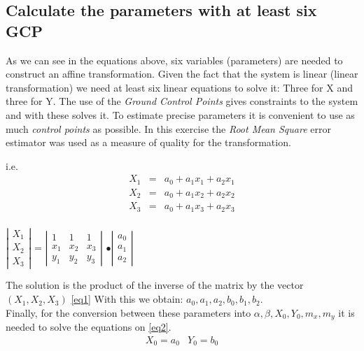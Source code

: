 \documentclass[12pt]{article}
\numberwithin{equation}{subsection}
\begin{document}
\subsection{Calculate the parameters with at least six GCP}
As we can see in the equations above, six variables (parameters) are needed to construct an affine transformation. Given the fact that the system is linear (linear transformation) we need at least six linear equations to solve it: Three for X and three for Y.
The use of the {\em Ground Control Points} gives constraints to the system and with these solves it.
To estimate precise parameters it is convenient to use as much {\em control points} as possible. In this exercise the {\em Root Mean Square} error estimator was used as a measure of quality for the transformation.



i.e.
\begin{equation}\label{eq3}
\begin{array}{lcl}
X_1 &=& a_0 + a_1x_1 + a_2x_1 \\
X_2 &=& a_0 + a_1x_2 + a_2x_2 \\
X_3 &=& a_0 + a_1x_3 + a_2x_3 \\
\end{array}
\end{equation}
\begin{center}
$
\left | \begin{array}{c}
X_1 \\ X_2 \\ X_3
\end{array} \right |
$
= 
$
\left | \begin{array}{ccc}
1 & 1 & 1 \\
x_1 & x_2 & x_3 \\
y_1 & y_2 & y_3  
\end{array} \right |
$
$
\bullet
\left | \begin{array}{c}
a_0 \\ a_1 \\ a_2
\end{array} \right | 
$
\end{center}
The solution is the product of the inverse of the matrix by the vector $(X_1,X_2,X_3)$ \ref{eq1}
 With this we obtain: ${a_0, a_1, a_2, b_0, b_1, b_2 }$. \\
 Finally, for the conversion between these parameters into $\alpha, \beta, X_0, Y_0, m_x, m_y$ it is needed to solve the equations on \ref{eq2}.
 $$
 \begin{array}{ll}
 X_0 = a_0 & Y_0 = b_0 \\
 \end{array}
 $$ 
\end{document}
